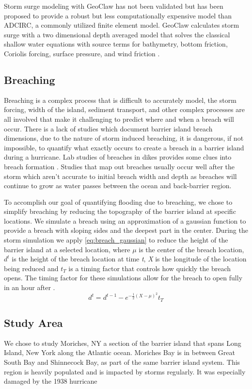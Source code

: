 \documentclass{coastal_paper}
\begin{document}
Storm surge modeling with GeoClaw has not been validated but has been proposed to provide a robust but less computationally expensive model than ADCIRC, a commonly utilized finite element model. GeoClaw calculates storm surge with a two dimensional depth averaged model that solves the classical shallow water equations with source terms for bathymetry, bottom friction, Coriolis forcing, surface pressure, and wind friction \citep{Mandli2014}. 

\subsection*{Breaching}
Breaching is a complex process that is difficult to accurately model, the storm forcing, width of the island, sediment transport, and other complex processes are all involved that make it challenging to predict where and when a breach will occur. There is a lack of studies which document barrier island breach dimensions, due to the nature of storm induced breaching, it is dangerous, if not impossible, to quantify what exactly occurs to create a breach in a barrier island during a hurricane. Lab studies of breaches in dikes provides some clues into breach formation \citep{Visser1999}. Studies that map out breaches usually occur well after the storm which aren't accurate to initial breach width and depth as breaches will continue to grow as water passes between the ocean and back-barrier region.

To accomplish our goal of quantifying flooding due to breaching, we chose to simplify breaching by reducing the topography of the barrier island at specific locations. We simulate a breach using an approximation of a gaussian function to provide a breach with sloping sides and the deepest part in the center. During the storm simulation we apply \ref{eq:breach_gaussian} to reduce the height of the barrier island at a selected location, where \emph{$\mu$} is the center of the breach location, \emph{$d^t$} is the height of the breach location at time \emph{t}, \emph{X} is the longitude of the location being reduced and \emph{$t_T$} is a timing factor that controls how quickly the breach opens. The timing factor for these simulations allow for the breach to open fully in an hour after \citet{Visser1999}.
\begin{equation}
    d^t = d^{t-1} - e^{-\frac{1}{2}{(X - \mu)^2}}t_T
    \label{eq:breach_gaussian}
\end{equation}

\subsection*{Study Area}
We chose to study Moriches, NY a section of the barrier island that spans Long Island, New York along the Atlantic ocean. Moriches Bay is in between Great South Bay and Shinnecock Bay, as part of the same barrier island system. This region is heavily populated and is impacted by storms regularly. It was especially damaged by the 1938 hurricane
\end{document}

